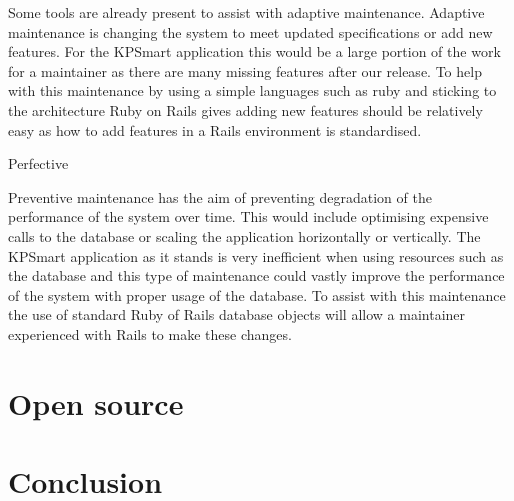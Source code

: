 \documentclass{style/CRPITStyle}
\renewcommand{\cite}{\citep}
\begin{document}
\vspace{.1in}

Some tools are already present to assist with adaptive maintenance. Adaptive
maintenance is changing the system to meet updated specifications or add new
features. For the KPSmart application this would be a large portion of the work
for a maintainer as there are many missing features after our release. To help
with this maintenance by using a simple languages such as ruby and sticking to
the architecture Ruby on Rails gives adding new features should be relatively
easy as how to add features in a Rails environment is standardised. 

\cite{Pigoski:1996}

\vspace{.1in}

Perfective

\vspace{.1in}

Preventive maintenance has the aim of preventing degradation of the performance
of the system over time. This would include optimising expensive calls to the
database or scaling the application horizontally or vertically. The KPSmart
application as it stands is very inefficient when using resources such as the database
and this type of maintenance could vastly improve the performance of the system
with proper usage of the database. To assist with this maintenance the
use of standard Ruby of Rails database objects will allow a maintainer
experienced with Rails to make these changes.

\section{Open source}

\cite{raymond:1999}

\section{Conclusion}



\end{document}
